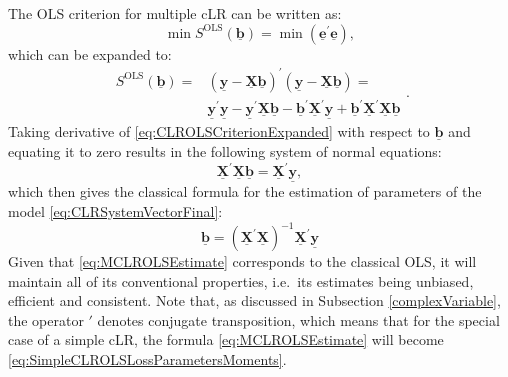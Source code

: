 \documentclass[
]{book}
\begin{document}
The OLS criterion for multiple cLR can be written as:
\begin{equation}
    \min S^{\mathrm{OLS}}(\underline{\boldsymbol{b}}) = \min \left(\underline{\mathbf{e}}^\prime \underline{\mathbf{e}}\right),
    \label{eq:CLROLSCriterion}
\end{equation}
which can be expanded to:
\begin{equation}
    \begin{aligned}
    S^{\mathrm{OLS}}(\underline{\boldsymbol{b}}) = & \left( \underline{\mathbf{y}} - \underline{\mathbf{X}} \underline{\boldsymbol{b}} \right)^\prime \left( \underline{\mathbf{y}} - \underline{\mathbf{X}} \underline{\boldsymbol{b}} \right) = \\
    & \underline{\mathbf{y}}^\prime \underline{\mathbf{y}} - \underline{\mathbf{y}}^\prime \underline{\mathbf{X}} \underline{\boldsymbol{b}} - \underline{\boldsymbol{b}}^\prime \underline{\mathbf{X}}^\prime \underline{\mathbf{y}} + \underline{\boldsymbol{b}}^\prime \underline{\mathbf{X}}^\prime \underline{\mathbf{X}} \underline{\boldsymbol{b}}
    \end{aligned}. 
    \label{eq:CLROLSCriterionExpanded}
\end{equation}
Taking derivative of \eqref{eq:CLROLSCriterionExpanded} with respect to \(\underline{\boldsymbol{b}}\) and equating it to zero results in the following system of normal equations:
\begin{equation*}
    \underline{\mathbf{X}}^\prime \underline{\mathbf{X}} \underline{\boldsymbol{b}} = \underline{\mathbf{X}}^\prime \underline{\mathbf{y}} ,
\end{equation*}
which then gives the classical formula for the estimation of parameters of the model \eqref{eq:CLRSystemVectorFinal}:
\begin{equation}
    \underline{\boldsymbol{b}} = \left( \underline{\mathbf{X}}^\prime \underline{\mathbf{X}} \right)^{-1} \underline{\mathbf{X}}^\prime \underline{\mathbf{y}}
    \label{eq:MCLROLSEstimate}
\end{equation}
Given that \eqref{eq:MCLROLSEstimate} corresponds to the classical OLS, it will maintain all of its conventional properties, i.e.~its estimates being unbiased, efficient and consistent. Note that, as discussed in Subsection \ref{complexVariable}, the operator \(\prime\) denotes conjugate transposition, which means that for the special case of a simple cLR, the formula \eqref{eq:MCLROLSEstimate} will become \eqref{eq:SimpleCLROLSLossParametersMoments}.
\end{document}
